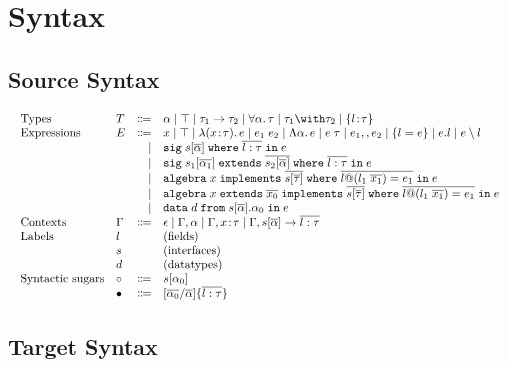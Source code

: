 \documentclass[a4paper]{article}
\begin{document}
\section{Syntax}

\subsection{Source Syntax}

\begin{displaymath}
    \begin{array}{l}
      \begin{array}{llrl}
        \text{Types}
        & T & \Coloneqq & \alpha \mid \top \mid \tau_1 \to \tau_2 \mid \for \alpha \tau \mid \tau_1 \andop \tau_2 \mid \recty l \tau \\
        \text{Expressions}
        & E & \Coloneqq & x \mid \top \mid \lam x \tau e \mid \app {e_1} {e_2} \mid \blam \alpha e \mid \tapp e \tau \mid e_1 \mergeop e_2 \mid \reccon l e \mid e.l \mid e \restrictop l \\
        &   & \mid & \sig s \alpha l \tau e \\
        &   & \mid & \sigext {s_1} {\alpha_1} {s_2} \alpha l \tau e \\
        &   & \mid & \alg x s \tau l {l_1} {x_1} {e_1} e \\
        &   & \mid & \algext x {x_0} s \tau l {l_1} {x_1} {e_1} e \\
        &   & \mid & \data d s \alpha {\alpha_0} e \\
        \text{Contexts} & \Gamma & \Coloneqq & \epsilon \mid \Gamma, \alpha \mid \Gamma, x \hast \tau \mid \Gamma, s {[} \overline{\alpha} {]}\to\overline{l:\tau} \\
        \text{Labels} & l &  & \text{(fields)} \\
        & s &  & \text{(interfaces)} \\
        & d &  & \text{(datatypes)}\\
        \text{Syntactic sugars} & \circ & \Coloneqq & s[\alpha_0] \\
        & \bullet & \Coloneqq & [\overline{\alpha_0}/\overline{\alpha}]\{\overline{l:\tau}\}
      \end{array}
    \end{array}
\end{displaymath}

\subsection{Target Syntax}
\end{document}
